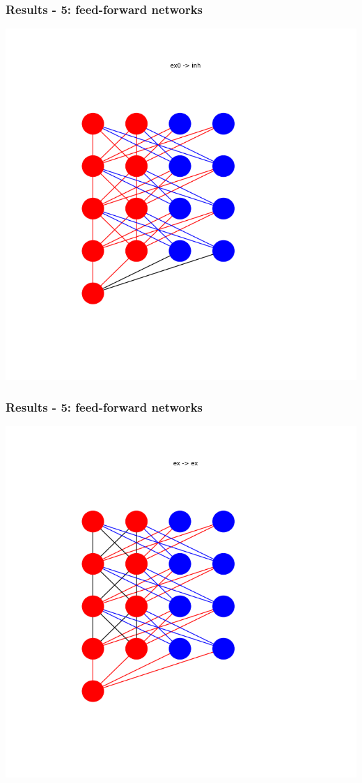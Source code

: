 \documentclass{beamer}
\begin{document}
\begin{frame}
    \frametitle{Results - 5: feed-forward networks}
    \includegraphics[width=\textwidth]{figures/ex0 -> inh.png}
\end{frame}

\begin{frame}
    \frametitle{Results - 5: feed-forward networks}
    \includegraphics[width=\textwidth]{figures/ex -> ex.png}
\end{frame}
\end{document}
